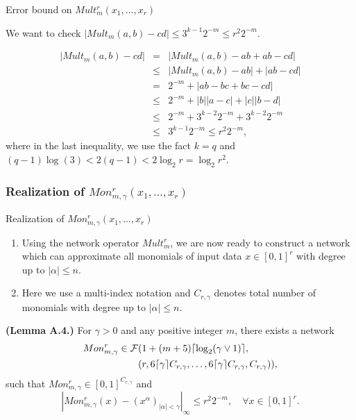 \documentclass{if-beamer}
\DeclarePairedDelimiter{\ceil}{\lceil}{\rceil}
\newcommand\STAR{\raisebox{-.7em}{\tikz{\node[draw,star,star point height=.7em,minimum size=1em]{};} }}
\begin{document}
\begin{frame}{Error bound on $Mult_{m}^{r}(x_{1},\dots,x_{r})$}

\STAR We want to check $\left| Mult_{m}(a,b) - cd \right|\leq 3^{k-1}2^{-m}\leq r^{2}2^{-m}$.

\begin{eqnarray*}
    \left| Mult_{m}(a,b) - cd \right| &=& 
    \left| Mult_{m}(a,b) - ab + ab - cd \right| \\
    &\leq& \left| Mult_{m}(a,b) - ab \right| +\left| ab - cd \right| \\
    &=& 2^{-m} + \left| ab-bc+bc-cd \right| \\
    &\leq& 2^{-m} + \left| b \right| \left| a-c \right| + \left| c \right| \left|b-d \right|\\
    &\leq& 2^{-m} + 3^{k-2}2^{-m} + 3^{k-2}2^{-m}\\
    &\leq& 3^{k-1}2^{-m} \leq r^{2}2^{-m},
\end{eqnarray*}
where in the last inequality, we use the fact
$k=q$ and $(q-1)\log(3)<2(q-1)<2\log_{2}r=\log_{2}r^{2}$.

\end{frame}

\subsubsection{Realization of $Mon_{m,\gamma}^{r}(x_{1},\dots,x_{r})$}
\begin{frame}{Realization of $Mon_{m,\gamma}^{r}(x_{1},\dots,x_{r})$}
\begin{enumerate}
    \item Using the network operator $Mult_m^{r}$, we are now ready to construct a network which can approximate all monomials of input data $x\in[0,1]^{r}$ with degree up to $|\alpha| \leq n$. 
    \item Here we use a multi-index notation and $C_{r,\gamma}$ denotes total number of monomials with degree up to $|\alpha| \leq n$. 
\end{enumerate}
\begin{tcolorbox}
    \textbf{(Lemma A.4.)}
    For $\gamma>0$ and any positive integer $m$, there exists a network 
    \begin{align*}
        Mon_{m,\gamma}^{r} \in \mathcal{F}&(1+(m+5) \ceil{\log_{2} (\gamma \vee 1)},\\
            &(r,6\ceil{\gamma}C_{r,\gamma},\dots,6\ceil{\gamma}C_{r,\gamma},C_{r,\gamma})),
    \end{align*}
    such that $Mon_{m,\gamma}^{r}\in[0,1]^{C_{r,\gamma}}$ and 
    \begin{equation*}
        \left| Mon_{m,\gamma}^{r}(x)- (x^{\alpha})_{|\alpha|<\gamma} \right|_{\infty} \leq r^{2}2^{-m},
        \quad \forall x \in [0,1]^{r}.
    \end{equation*}
\end{tcolorbox}

\end{frame}
\end{document}
